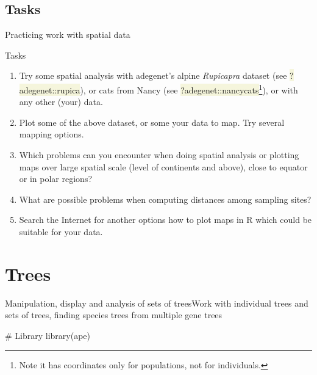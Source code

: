 \documentclass[compress, ucs, xelatex, 11pt, xcolor=svgnames, aspectratio=169,
	hyperref={
		bookmarks=true,
		unicode=true,
		colorlinks=true,
		pdftitle={Molecular data in R},
		plainpages=false,
		pdfauthor={Vojtech Zeisek},
		pdfsubject={Course about phylogeny and evolution in R},
		pdfcreator={XeLaTeX},
		pdfkeywords={R, evolution, phylogeny, molecular data},
		linkcolor=Crimson, %
		anchorcolor=Magenta, %
		citecolor=Magenta, %
		filecolor=Magenta, %
		menucolor=Magenta, %
		urlcolor=DodgerBlue, %
		pdftex},
	url={hyphens, lowtilde} %
	]{beamer}
\renewcommand{\texttt}[1]{\colorbox{Beige}{{\ttfamily #1}}}
\begin{document}
\subsection{Tasks}

\begin{frame}{Practicing work with spatial data}
	\begin{exampleblock}{Tasks}
		\begin{enumerate}
			\item Try some spatial analysis with adegenet's alpine \textit{Rupicapra} dataset (see \texttt{?adegenet::rupica}), or cats from Nancy (see \texttt{?adegenet::nancycats}\footnote{Note it has coordinates only for populations, not for individuals.}), or with any other (your) data.
			\item Plot some of the above dataset, or some your data to map. Try several mapping options.
			\item Which problems can you encounter when doing spatial analysis or plotting maps over large spatial scale (level of continents and above), close to equator or in polar regions?
			\item What are possible problems when computing distances among sampling sites?
			\item Search the Internet for another options how to plot maps in R which could be suitable for your data.
		\end{enumerate}
	\end{exampleblock}
\end{frame}

\section{Trees}

\begin{frame}[fragile]{Manipulation, display and analysis of sets of trees}{Work with individual trees and sets of trees, finding species trees from multiple gene trees}
	\tableofcontents[currentsection, sectionstyle=show/hide, hideothersubsections]
	\begin{spluscode}
    # Library
    library(ape)
	\end{spluscode}
\end{frame}
\end{document}
